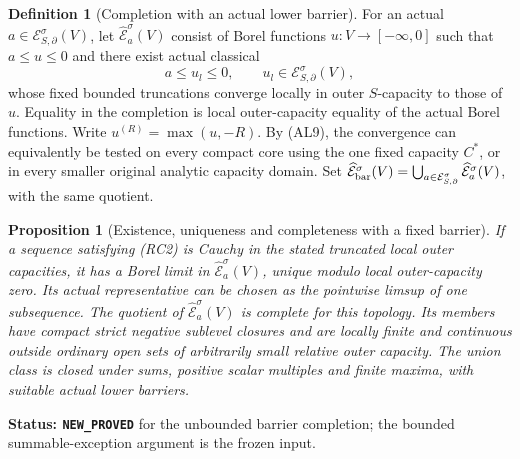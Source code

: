 \documentclass[11pt,a4paper]{article}
\numberwithin{equation}{section}
\newtheorem{proposition}[theorem]{Proposition}
\theoremstyle{definition}
\newtheorem{definition}[theorem]{Definition}
\theoremstyle{remark}
\begin{document}
\begin{definition}[Completion with an actual lower barrier]
\label{def:r11-barrier-completion}
For an actual $a\in\mathcal E^\sigma_{S,\partial}(V)$,
let $\widehat{\mathcal E}^{\sigma}_a(V)$ consist of Borel
functions $u:V\to[-\infty,0]$ such that $a\leq u\leq0$
and there exist actual classical
\[
       a\leq u_l\leq0,\qquad
       u_l\in\mathcal E^\sigma_{S,\partial}(V),
 \tag{RC2}
\]
whose fixed bounded truncations converge locally in outer
$S$-capacity to those of $u$. Equality in the completion is
local outer-capacity equality of the actual Borel functions.
Write $u^{(R)}=\max(u,-R)$. By (AL9), the convergence can
equivalently be tested on every compact core using the one
fixed capacity $C^*$, or in every smaller original analytic
capacity domain. Set
$\widehat{\mathcal E}^{\sigma}_{\rm bar}(V)
=\bigcup_{a\in\mathcal E^\sigma_{S,\partial}}
\widehat{\mathcal E}^{\sigma}_a(V)$, with the same quotient.
\end{definition}

\begin{proposition}[Existence, uniqueness and completeness with a fixed barrier]
\label{prop:r11-barrier-completion-existence}
If a sequence satisfying (RC2) is Cauchy in the stated
truncated local outer capacities, it has a Borel limit in
$\widehat{\mathcal E}^{\sigma}_a(V)$, unique modulo local
outer-capacity zero. Its actual representative can be chosen
as the pointwise limsup of one subsequence. The quotient of
$\widehat{\mathcal E}^{\sigma}_a(V)$ is complete for this
topology. Its members have compact strict negative sublevel
closures and are locally finite and continuous outside ordinary
open sets of arbitrarily small relative outer capacity.
The union class is closed under sums, positive scalar multiples
and finite maxima, with suitable actual lower barriers.
\end{proposition}

\noindent\textbf{Status: \texttt{NEW\_PROVED}} for the
unbounded barrier completion; the bounded summable-exception
argument is the frozen input.
\end{document}
